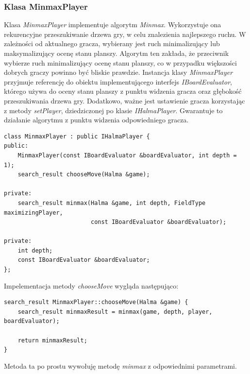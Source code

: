 \documentclass[a4paper, 12pt]{article}
\begin{document}
\subsubsection{Klasa MinmaxPlayer}
Klasa \textit{MinmaxPlayer} implementuje algorytm \textit{Minmax}.
Wykorzystuje ona rekurencyjne przeszukiwanie drzewa gry, w celu znalezienia
najlepszego ruchu. W zależności od aktualnego gracza, wybierany jest ruch
minimalizujący lub maksymalizujący ocenę stanu planszy. Algorytm ten zakłada,
że przeciwnik wybierze ruch minimalizujący ocenę stanu planszy, co w przypadku większości
dobrych graczy powinno być bliskie prawdzie. Instancja klasy \textit{MinmaxPlayer}
przyjmuje referencję do obiektu implementującego interfejs \textit{IBoardEvaluator},
którego używa do oceny stanu planszy z punktu widzenia gracza oraz głębokość 
przeszukiwania drzewa gry. Dodatkowo, ważne jest ustawienie 
gracza korzystając z metody \textit{setPlayer}, 
dziedziczonej po klasie \textit{IHalmaPlayer}. Gwarantuje to 
działanie algorytmu z punktu widzenia odpowiedniego gracza.
\begin{lstlisting}
class MinmaxPlayer : public IHalmaPlayer {
public:
    MinmaxPlayer(const IBoardEvaluator &boardEvaluator, int depth = 1);
    search_result chooseMove(Halma &game);

private:
    search_result minmax(Halma &game, int depth, FieldType maximizingPlayer,
                         const IBoardEvaluator &boardEvaluator);

private:
    int depth;
    const IBoardEvaluator &boardEvaluator;
};
\end{lstlisting}

Impelementacja metody \textit{chooseMove} wygląda następująco:
\begin{lstlisting}
search_result MinmaxPlayer::chooseMove(Halma &game) {
    search_result minmaxResult = minmax(game, depth, player, boardEvaluator);

    return minmaxResult;
}
\end{lstlisting}
Metoda ta po prostu wywołuję metodę \textit{minmax} z odpowiednimi parametrami.
\end{document}
